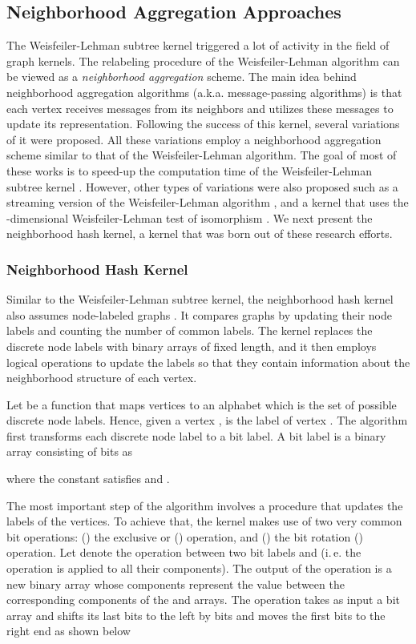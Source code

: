 \documentclass[twoside,11pt]{article}
\newcommand{\ie}{i.\,e. }
\begin{document}
\subsection{Neighborhood Aggregation Approaches}
The Weisfeiler-Lehman subtree kernel triggered a lot of activity in the field of graph kernels.
The relabeling procedure of the Weisfeiler-Lehman algorithm can be viewed as a \textit{neighborhood aggregation} scheme.
The main idea behind neighborhood aggregation algorithms (a.k.a. message-passing algorithms) is that each vertex receives messages from its neighbors and utilizes these messages to update its representation.
Following the success of this kernel, several variations of it were proposed.
All these variations employ a neighborhood aggregation scheme similar to that of the Weisfeiler-Lehman algorithm.
The goal of most of these works is to speed-up the computation time of the Weisfeiler-Lehman subtree kernel \cite{hido2009linear,kataoka2016hadamard}.
However, other types of variations were also proposed such as a streaming version of the Weisfeiler-Lehman algorithm \cite{li2012nested}, and a kernel that uses the -dimensional Weisfeiler-Lehman test of isomorphism \cite{morris2017global}.
We next present the neighborhood hash kernel, a kernel that was born out of these research efforts.

\subsubsection{Neighborhood Hash Kernel}
Similar to the Weisfeiler-Lehman subtree kernel, the neighborhood hash kernel also assumes node-labeled graphs \cite{hido2009linear}.
It compares graphs by updating their node labels and counting the number of common labels.
The kernel replaces the discrete node labels with binary arrays of fixed length, and it then employs logical operations to update the labels so that they contain information about the neighborhood structure of each vertex.

Let  be a function that maps vertices to an alphabet  which is the set of possible discrete node labels.
Hence, given a vertex ,  is the label of vertex .
The algorithm first transforms each discrete node label to a bit label.
A bit label is a binary array consisting of  bits as

where the constant  satisfies  and .

The most important step of the algorithm involves a procedure that updates the labels of the vertices.
To achieve that, the kernel makes use of two very common bit operations: () the exclusive or () operation, and () the bit rotation () operation.
Let  denote the  operation between two bit labels  and  (\ie the  operation is applied to all their components).
The output of the operation is a new binary array whose components represent the  value between the corresponding components of the  and  arrays.
The  operation takes as input a bit array and shifts its last  bits to the left by  bits and moves the first  bits to the right end as shown below  
\end{document}
